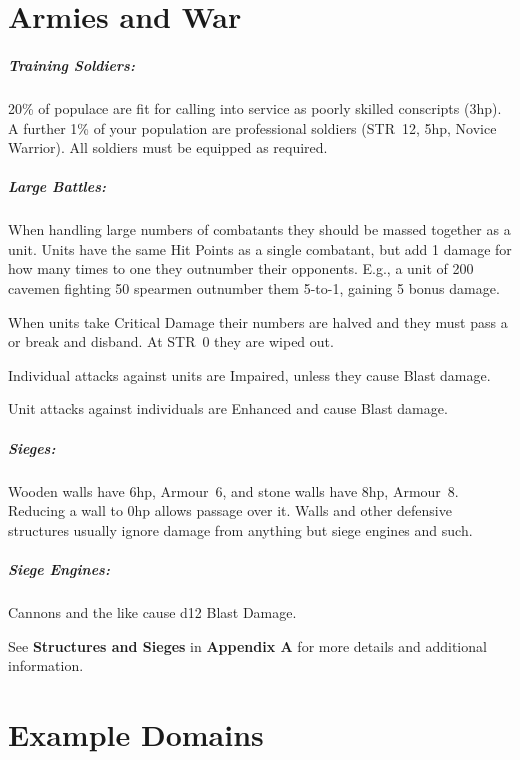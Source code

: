 \documentclass[itdr]{subfiles}
\begin{document}
\vfill

\section{Armies and War}


\subparagraph{Training Soldiers:} 20\% of populace are fit for calling into service as poorly skilled conscripts (3hp). A further 1\% of your population are professional soldiers (STR~12, 5hp, Novice Warrior). All soldiers must be equipped as required.

\subparagraph{Large Battles:} When handling large numbers of combatants they should be massed together as a unit. Units have the same Hit Points as a single combatant, but add 1 damage for how many times to one they outnumber their opponents. E.g., a unit of 200 cavemen fighting 50 spearmen outnumber them 5-to-1, gaining 5 bonus damage.

When units take Critical Damage their numbers are halved and they must pass a  or break and disband. At STR~0 they are wiped out.

Individual attacks against units are Impaired, unless they cause Blast damage.

Unit attacks against individuals are Enhanced and cause Blast damage.

\subparagraph{Sieges:} Wooden walls have 6hp, Armour~6, and stone walls have 8hp, Armour~8. Reducing a wall to 0hp allows passage over it. Walls and other defensive structures usually ignore damage from anything but siege engines and such.

\subparagraph{Siege Engines:} Cannons and the like cause d12 Blast Damage.

\vspace{-0.2em}
\begin{dbox}
	See \textbf{Structures and Sieges} in \textbf{Appendix A} for more details and additional information.
\end{dbox}

\vfill

\section{Example Domains}
\end{document}
